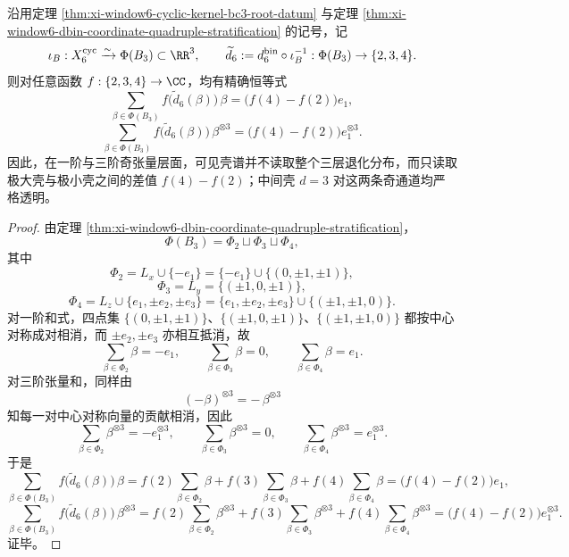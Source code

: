 \begin{theorem}\label{thm:xi-time-part9y-window6-visible-odd-tensor-extremal-selector}
沿用定理 \ref{thm:xi-window6-cyclic-kernel-bc3-root-datum} 与定理 \ref{thm:xi-window6-dbin-coordinate-quadruple-stratification} 的记号，记
\[
\iota_B:X_6^{\mathrm{cyc}}\xrightarrow{\sim}\Phi(B_3)\subset \RR^3,
\qquad
\widetilde d_6:=d_6^{\mathrm{bin}}\circ \iota_B^{-1}:\Phi(B_3)\to\{2,3,4\}.
\]
则对任意函数 \(f:\{2,3,4\}\to\CC\)，均有精确恒等式
\[
\sum_{\beta\in\Phi(B_3)} f\bigl(\widetilde d_6(\beta)\bigr)\,\beta
=
\bigl(f(4)-f(2)\bigr)e_1,
\]
\[
\sum_{\beta\in\Phi(B_3)} f\bigl(\widetilde d_6(\beta)\bigr)\,\beta^{\otimes 3}
=
\bigl(f(4)-f(2)\bigr)e_1^{\otimes 3}.
\]
因此，在一阶与三阶奇张量层面，可见壳谱并不读取整个三层退化分布，而只读取极大壳与极小壳之间的差值 \(f(4)-f(2)\)；中间壳 \(d=3\) 对这两条奇通道均严格透明。
\end{theorem}
\begin{proof}
由定理 \ref{thm:xi-window6-dbin-coordinate-quadruple-stratification}，
\[
\Phi(B_3)
=
\Phi_2\sqcup \Phi_3\sqcup \Phi_4,
\]
其中
\[
\Phi_2
=
L_x\cup\{-e_1\}
=
\{-e_1\}\cup\{(0,\pm1,\pm1)\},
\]
\[
\Phi_3
=
L_y
=
\{(\pm1,0,\pm1)\},
\]
\[
\Phi_4
=
L_z\cup\{e_1,\pm e_2,\pm e_3\}
=
\{e_1,\pm e_2,\pm e_3\}\cup\{(\pm1,\pm1,0)\}.
\]
对一阶和式，四点集 \(\{(0,\pm1,\pm1)\}\)、\(\{(\pm1,0,\pm1)\}\)、\(\{(\pm1,\pm1,0)\}\) 都按中心对称成对相消，而 \(\pm e_2,\pm e_3\) 亦相互抵消，故
\[
\sum_{\beta\in\Phi_2}\beta=-e_1,
\qquad
\sum_{\beta\in\Phi_3}\beta=0,
\qquad
\sum_{\beta\in\Phi_4}\beta=e_1.
\]
对三阶张量和，同样由
\[
(-\beta)^{\otimes 3}=-\,\beta^{\otimes 3}
\]
知每一对中心对称向量的贡献相消，因此
\[
\sum_{\beta\in\Phi_2}\beta^{\otimes 3}=-e_1^{\otimes 3},
\qquad
\sum_{\beta\in\Phi_3}\beta^{\otimes 3}=0,
\qquad
\sum_{\beta\in\Phi_4}\beta^{\otimes 3}=e_1^{\otimes 3}.
\]
于是
\[
\sum_{\beta\in\Phi(B_3)} f\bigl(\widetilde d_6(\beta)\bigr)\,\beta
=
f(2)\sum_{\beta\in\Phi_2}\beta
+f(3)\sum_{\beta\in\Phi_3}\beta
+f(4)\sum_{\beta\in\Phi_4}\beta
=
\bigl(f(4)-f(2)\bigr)e_1,
\]
\[
\sum_{\beta\in\Phi(B_3)} f\bigl(\widetilde d_6(\beta)\bigr)\,\beta^{\otimes 3}
=
f(2)\sum_{\beta\in\Phi_2}\beta^{\otimes 3}
+f(3)\sum_{\beta\in\Phi_3}\beta^{\otimes 3}
+f(4)\sum_{\beta\in\Phi_4}\beta^{\otimes 3}
=
\bigl(f(4)-f(2)\bigr)e_1^{\otimes 3}.
\]
证毕。
\end{proof}

